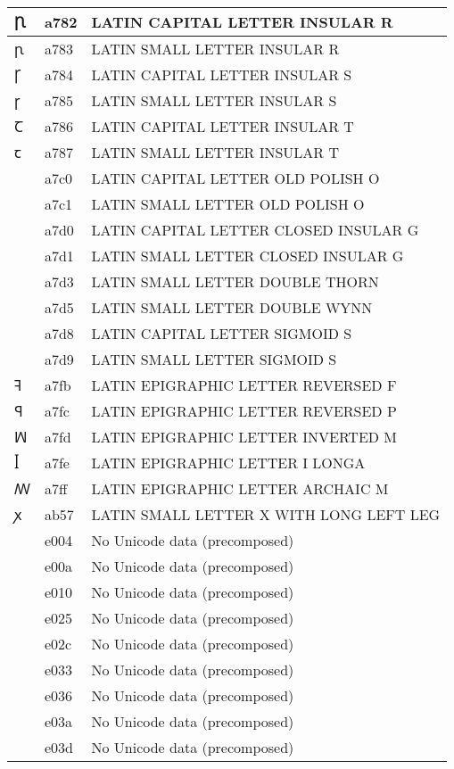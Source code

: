 \documentclass[12pt,letterpaper,openany]{book}
\begin{document}
\begin{center}
\begin{supertabular}{|m{0.25in}|m{0.5in}|m{4in}|}
Ꞃ & a782 & LATIN CAPITAL LETTER INSULAR R\\\hline
ꞃ & a783 & LATIN SMALL LETTER INSULAR R\\\hline
Ꞅ & a784 & LATIN CAPITAL LETTER INSULAR S\\\hline
ꞅ & a785 & LATIN SMALL LETTER INSULAR S\\\hline
Ꞇ & a786 & LATIN CAPITAL LETTER INSULAR T\\\hline
ꞇ & a787 & LATIN SMALL LETTER INSULAR T\\\hline
Ꟁ & a7c0 & LATIN CAPITAL LETTER OLD POLISH O\\\hline
ꟁ & a7c1 & LATIN SMALL LETTER OLD POLISH O\\\hline
Ꟑ & a7d0 & LATIN CAPITAL LETTER CLOSED INSULAR G\\\hline
ꟑ & a7d1 & LATIN SMALL LETTER CLOSED INSULAR G\\\hline
ꟓ & a7d3 & LATIN SMALL LETTER DOUBLE THORN\\\hline
ꟕ & a7d5 & LATIN SMALL LETTER DOUBLE WYNN\\\hline
Ꟙ & a7d8 & LATIN CAPITAL LETTER SIGMOID S\\\hline
ꟙ & a7d9 & LATIN SMALL LETTER SIGMOID S\\\hline
ꟻ & a7fb & LATIN EPIGRAPHIC LETTER REVERSED F\\\hline
ꟼ & a7fc & LATIN EPIGRAPHIC LETTER REVERSED P\\\hline
ꟽ & a7fd & LATIN EPIGRAPHIC LETTER INVERTED M\\\hline
ꟾ & a7fe & LATIN EPIGRAPHIC LETTER I LONGA\\\hline
ꟿ & a7ff & LATIN EPIGRAPHIC LETTER ARCHAIC M\\\hline
ꭗ & ab57 & LATIN SMALL LETTER X WITH LONG LEFT LEG\\\hline
 & e004 & No Unicode data (precomposed)\\\hline
 & e00a & No Unicode data (precomposed)\\\hline
 & e010 & No Unicode data (precomposed)\\\hline
 & e025 & No Unicode data (precomposed)\\\hline
 & e02c & No Unicode data (precomposed)\\\hline
 & e033 & No Unicode data (precomposed)\\\hline
 & e036 & No Unicode data (precomposed)\\\hline
 & e03a & No Unicode data (precomposed)\\\hline
 & e03d & No Unicode data (precomposed)\\\hline

\end{supertabular}
\end{center}
\end{document}
